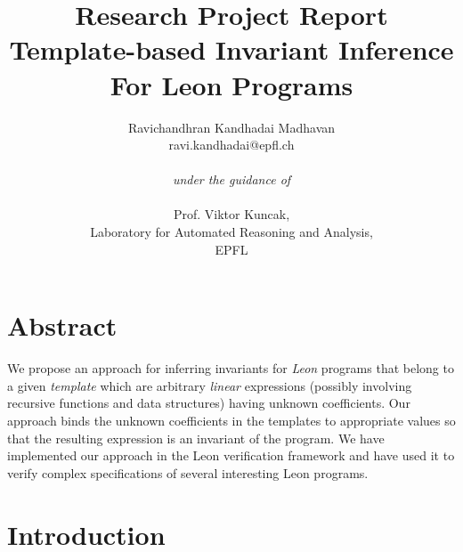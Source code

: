\documentclass[a4paper,10pt]{article}
\begin{document}
\title{Research Project Report \\ 
Template-based Invariant Inference For Leon Programs}
\author{Ravichandhran Kandhadai Madhavan 
\\ ravi.kandhadai@epfl.ch\\ \\
\textit{under the guidance of} \\ \\
Prof. Viktor Kuncak, \\
Laboratory for Automated Reasoning and Analysis, \\
EPFL \\
}
\maketitle

\newcommand{\dash}[1]{\overline{#1}}
\newcommand{\progst}[1]{\texttt{#1}}
\newcommand{\temp}{\mathit{\phi_{temp}}}
\newcommand{\post}{\mathit{\phi_{post}}}
\newcommand{\body}{\mathit{\phi_{body}}}
\newcommand{\zerovec}{\mathbf{0}}
\newcommand{\Body}[1]{\mathit{Body(#1)}}
\newcommand{\Post}[1]{\mathit{Post(#1)}}
\newcommand{\Temp}[1]{\mathit{Temp(#1)}}



\section{Abstract}

We propose an approach for inferring invariants for \emph{Leon} programs that belong to a given \emph{template} which are arbitrary \emph{linear} expressions (possibly involving  recursive functions and data structures) having unknown coefficients.
Our approach binds the unknown coefficients in the templates to appropriate values so that the resulting expression
is an invariant of the program.
We have implemented our approach in the Leon verification framework and have used it to verify complex specifications 
of several interesting Leon programs.

\section{Introduction}
\end{document}
